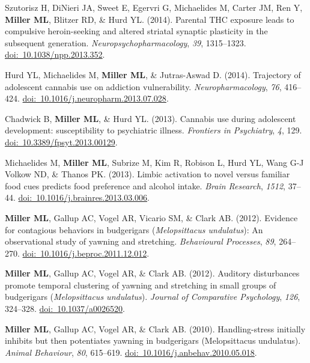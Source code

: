 \documentclass[10pt]{article}
\begin{document}
\begin{description}
\item Szutorisz H, DiNieri JA, Sweet E, Egervri G, Michaelides M, Carter JM, Ren Y, \textbf{Miller ML}, Blitzer RD, \& Hurd YL. (2014). Parental THC exposure leads to compulsive heroin-seeking and altered striatal synaptic plasticity in the subsequent generation. \textit{Neuropsychopharmacology}, \textit{39}, 1315--1323. \href{https://doi.org/10.1038/npp.2013.352}{doi:~10.1038/npp.2013.352}.
\item Hurd YL, Michaelides M, \textbf{Miller ML}, \& Jutras-Aswad D. (2014). Trajectory of adolescent cannabis use on addiction vulnerability. \textit{Neuropharmacology}, \textit{76}, 416--424. \href{https://doi.org/10.1016/j.neuropharm.2013.07.028}{doi:~10.1016/j.neuropharm.2013.07.028}.
\item Chadwick B, \textbf{Miller ML}, \& Hurd YL. (2013). Cannabis use during adolescent development: susceptibility to psychiatric illness. \textit{Frontiers in Psychiatry}, \textit{4}, 129. \href{https://doi.org/10.3389/fpsyt.2013.00129}{doi:~10.3389/fpsyt.2013.00129}.
\item Michaelides M, \textbf{Miller ML}, Subrize M, Kim R, Robison L, Hurd YL, Wang G-J Volkow ND, \& Thanos PK. (2013). Limbic activation to novel versus familiar food cues predicts food preference and alcohol intake. \textit{Brain Research}, \textit{1512}, 37--44. \href{https://doi.org/10.1016/j.brainres.2013.03.006}{doi:~10.1016/j.brainres.2013.03.006}.
\item \textbf{Miller ML}, Gallup AC, Vogel AR, Vicario SM, \& Clark AB. (2012). Evidence for contagious behaviors in budgerigars (\textit{Melopsittacus undulatus}): An observational study of yawning and stretching. \textit{Behavioural Processes}, \textit{89}, 264--270. \href{https://doi.org/10.1016/j.beproc.2011.12.012}{doi:~10.1016/j.beproc.2011.12.012}.
\item \textbf{Miller ML}, Gallup AC, Vogel AR, \& Clark AB. (2012). Auditory disturbances promote temporal clustering of yawning and stretching in small groups of budgerigars (\textit{Melopsittacus undulatus}). \textit{Journal of Comparative Psychology}, \textit{126}, 324--328. \href{https://doi.org/10.1037/a0026520}{doi:~10.1037/a0026520}.
\item \textbf{Miller ML}, Gallup AC, Vogel AR, \& Clark AB. (2010). Handling-stress initially inhibits but then potentiates yawning in budgerigars (Melopsittacus undulatus). \textit{Animal Behaviour}, \textit{80}, 615--619. \href{https://doi.org/10.1016/j.anbehav.2010.05.018}{doi:~10.1016/j.anbehav.2010.05.018}.

\end{description}
\end{document}
